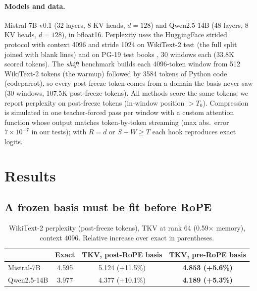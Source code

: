 \documentclass{article}
\begin{document}
\paragraph{Models and data.}
Mistral-7B-v0.1 \citep{mistral2023} (32 layers, 8 KV heads, $d{=}128$) and
Qwen2.5-14B \citep{qwen25} (48 layers, 8 KV heads, $d{=}128$), in bfloat16.
Perplexity uses the HuggingFace strided protocol with context 4096 and stride
1024 on WikiText-2 test \citep{merity2017} (the full split joined with blank
lines) and on PG-19 test books \citep{rae2020}, 30 windows each (33.8K scored
tokens). The \emph{shift} benchmark builds each 4096-token window from 512
WikiText-2 tokens (the warmup) followed by 3584 tokens of Python code
(codeparrot), so every post-freeze token comes from a domain the basis never
saw (30 windows, 107.5K post-freeze tokens). All methods score the same
tokens; we report perplexity on post-freeze tokens (in-window position
$> T_0$). Compression is simulated in one teacher-forced pass per window with
a custom attention function whose output matches token-by-token streaming
(max abs.\ error $7\times10^{-7}$ in our tests); with $R{=}d$ or
$S{+}W \ge T$ each hook reproduces exact logits.

\section{Results}
\label{sec:results}

\subsection{A frozen basis must be fit before RoPE}
\label{sec:rope}

\begin{table}[t]
\centering
\caption{WikiText-2 perplexity (post-freeze tokens), TKV at rank 64
(0.59$\times$ memory), context 4096. Relative increase over exact in parentheses.}
\label{tab:rope}
\small
\begin{tabular}{lccc}
\toprule
& Exact & TKV, post-RoPE basis & TKV, pre-RoPE basis \\
\midrule
Mistral-7B  & 4.595 & 5.124 (+11.5\%) & \textbf{4.853 (+5.6\%)} \\
Qwen2.5-14B & 3.977 & 4.377 (+10.1\%) & \textbf{4.189 (+5.3\%)} \\
\bottomrule
\end{tabular}
\end{table}
\end{document}
